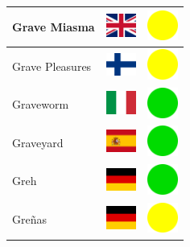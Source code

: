 \documentclass[12pt, a4paper, twoside]{report}
\begin{document}
\begin{center}
\begin{longtable}{|p{5cm}|p{2cm}|p{2cm}|}
 Grave Miasma                                               & \includegraphics[width=1cm]{../img/flags/gb} &   \includegraphics[width=1cm]{../likes/m} \\ \hline
 Grave Pleasures                                            & \includegraphics[width=1cm]{../img/flags/fi} &   \includegraphics[width=1cm]{../likes/m} \\ \hline
 Graveworm                                                  & \includegraphics[width=1cm]{../img/flags/it} &   \includegraphics[width=1cm]{../likes/y} \\ \hline
 Graveyard                                                  & \includegraphics[width=1cm]{../img/flags/es} &   \includegraphics[width=1cm]{../likes/y} \\ \hline
 Greh                                                       & \includegraphics[width=1cm]{../img/flags/de} &   \includegraphics[width=1cm]{../likes/y} \\ \hline
 Greñas                                                     & \includegraphics[width=1cm]{../img/flags/de} &   \includegraphics[width=1cm]{../likes/m} \\ \hline

\end{longtable}
\end{center}
\end{document}
